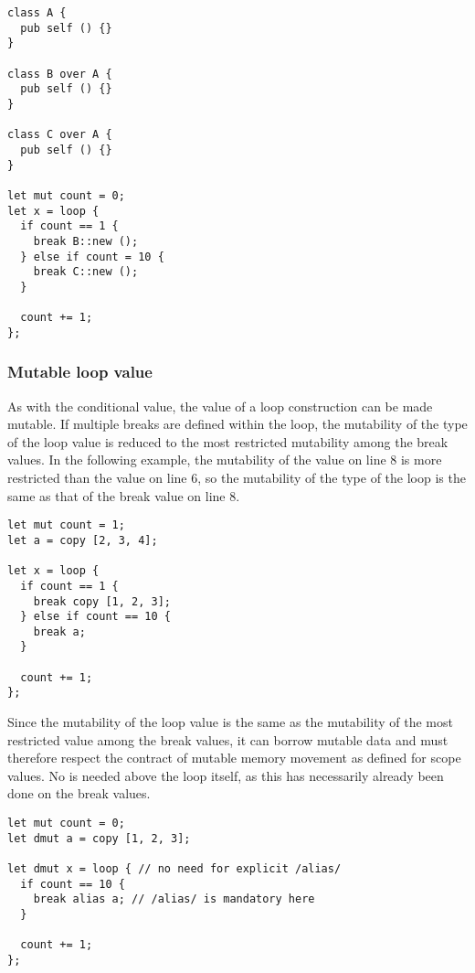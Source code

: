 \begin{lstlisting}[style=coloredverbatim, escapechar=@]
class A {
  pub self () {}
}

class B over A {
  pub self () {}
}

class C over A {
  pub self () {}
}

let mut count = 0;
let x = loop {
  if count == 1 {
    break B::new ();
  } else if count = 10 {
    break C::new ();
  }

  count += 1;
};
\end{lstlisting}


\subsubsection {Mutable loop value}

As with the conditional value, the value of a loop construction can be made
mutable. If multiple breaks are defined within the loop, the mutability of the
type of the loop value is reduced to the most restricted mutability among the
break values. In the following example, the mutability of the value on line 8 is
more restricted than the value on line 6, so the mutability of the type of the
loop is the same as that of the break value on line 8.

\begin{lstlisting}[style=coloredverbatim, escapechar=@]
let mut count = 1;
let a = copy [2, 3, 4];

let x = loop {
  if count == 1 {
    break copy [1, 2, 3];
  } else if count == 10 {
    break a;
  }

  count += 1;
};
\end{lstlisting}

Since the mutability of the loop value is the same as the mutability of the most
restricted value among the break values, it can borrow mutable data and must
therefore respect the contract of mutable memory movement as defined for scope
values. No  is needed above the loop itself, as this has
necessarily already been done on the break values.

\begin{lstlisting}[style=coloredverbatim, escapechar=@]
let mut count = 0;
let dmut a = copy [1, 2, 3];

let dmut x = loop { // no need for explicit /alias/
  if count == 10 {
    break alias a; // /alias/ is mandatory here
  }

  count += 1;
};
\end{lstlisting}

